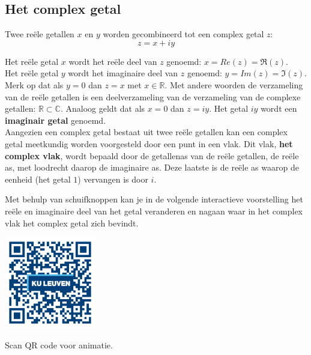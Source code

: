 \subsection{Het complex getal}

\begin{definitie}
Twee re\"{e}le getallen $x$ en $y$ worden gecombineerd tot een complex getal $z$:
\begin{equation*}
z=x+iy
\end{equation*}
\end{definitie}

Het re\"{e}le getal $x$ wordt het re\"{e}le deel van $z$ genoemd: $x=Re(z)=\Re(z)$.\\
Het re\"{e}le getal $y$ wordt het imaginaire deel van $z$ genoemd: $y=Im(z)=\Im(z)$.\\
Merk op dat als $y=0$ dan $z=x$ met $x \in \mathbb{R}$. Met andere woorden de verzameling van de re\"{e}le getallen is een deelverzameling van de verzameling van de complexe getallen: $\mathbb{R} \subset \mathbb{C}$. Analoog geldt dat als $x=0$ dan $z=iy$. Het getal $iy$ wordt een {\bf imaginair getal} genoemd.\\

Aangezien een complex getal bestaat uit twee re\"{e}le getallen kan een complex getal meetkundig worden voorgesteld door een punt in een vlak. Dit vlak, {\bf het complex vlak}, wordt bepaald door de getallenas van de re\"{e}le getallen, de re\"{e}le as, met loodrecht daarop de imaginaire as. Deze laatste is de re\"{e}le as waarop de eenheid (het getal $1$) vervangen is door $i$.  



Met behulp van schuifknoppen kan je in de volgende interactieve voorstelling het re\"{e}le en imaginaire deel van het getal veranderen en nagaan waar in het complex vlak het complex getal zich bevindt.\\


\begin{minipage}{.25\linewidth}
	\raggedright
	\includegraphics[width=4cm]{3_gonio_complexe_getallen/inputs/QR_Code_ANIMATIE1_module3new}
\end{minipage}
\begin{minipage}{.7\linewidth}
	Scan QR code voor animatie.
\end{minipage}\\

